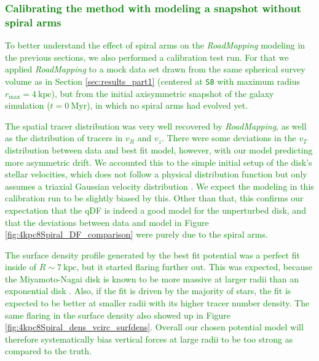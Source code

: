 \documentclass[iop,revtex4,numberedappendix,appendixfloats]{emulateapj}
\newcommand{\RM}{{\sl RoadMapping}}
\newcommand{\NEW}[1]{\textcolor{Green}{#1}}
\newcommand{\hiddenComment}[1]{}
\begin{document}
\hiddenComment{[TO DO: Jo writes: "If you make the equivalent of Figure 7 for fits that are especially good and those that are especially bad, is the difference between the qDF prediction and the data that went into the analysis very different? If so, that might be nice to point out and then say that we will investigate this in later work." $\longrightarrow$ I should do this as part of the review process.]}

\subsubsection{\NEW{Calibrating the method with modeling a snapshot without spiral arms}} \label{sec:MNdHHinit}

\NEW{To better understand the effect of spiral arms on the \RM{} modeling in the previous sections, we also performed a calibration test run. For that we applied \RM{} to a mock data set drawn from the same spherical survey volume as in Section \ref{sec:results_part1} (centered at \texttt{S8} with maximum radius $r_\text{max}=4~\text{kpc}$), but from the initial axisymmetric snapshot of the galaxy simulation ($t=0~\text{Myr}$), in which no spiral arms had evolved yet.}

\NEW{The spatial tracer distribution was very well recovered by \RM{}, as well as the distribution of tracers in $v_R$ and $v_z$. There were some deviations in the $v_T$ distribution between data and best fit model, however, with our model predicting more asymmetric drift. We accounted this to the simple initial setup of the disk's stellar velocities, which does not follow a physical distribution function but only assumes a triaxial Gaussian velocity distribution \citep{2005MNRAS.361..776S}. We expect the modeling in this calibration run to be slightly biased by this. Other than that, this confirms our expectation that the qDF is indeed a good model for the unperturbed disk, and that the deviations between data and model in Figure \ref{fig:4kpc8Spiral_DF_comparison} were purely due to the spiral arms.}

\NEW{The surface density profile generated by the best fit potential was a perfect fit inside of $R\sim7~\text{kpc}$, but it started flaring further out. This was expected, because the Miyamoto-Nagai disk is known to be more massive at larger radii than an exponential disk \citep{2015MNRAS.448.2934S}. Also, if the fit is driven by the majority of stars, the fit is expected to be better at smaller radii with its higher tracer number density. The same flaring in the surface density also showed up in Figure \ref{fig:4kpc8Spiral_dens_vcirc_surfdens}. Overall our chosen potential model will therefore systematically bias vertical forces at large radii to be too strong as compared to the truth.}
\end{document}
